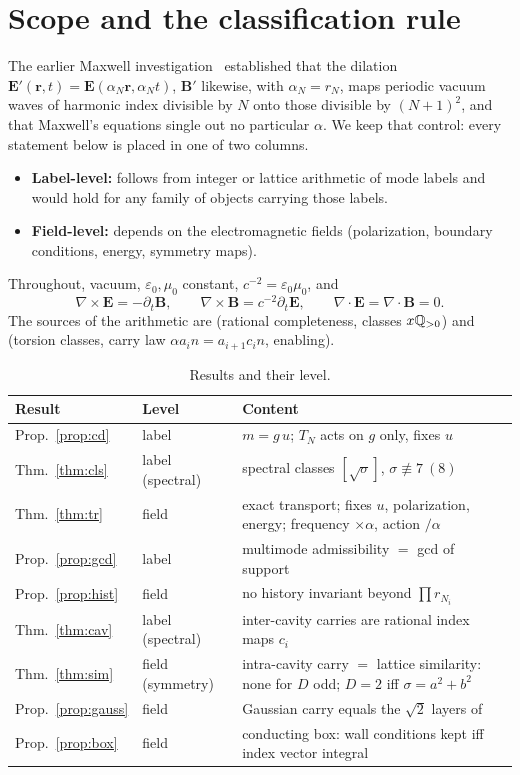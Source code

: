 \documentclass[11pt,a4paper]{article}
\theoremstyle{definition}
\theoremstyle{remark}
\newcommand{\bE}{\mathbf E}\newcommand{\bB}{\mathbf B}
\begin{document}
\section{Scope and the classification rule}
The earlier Maxwell investigation~\cite{MX} established that the dilation $\bE'(\mathbf r,t)=\bE(\alpha_N\mathbf r,\alpha_Nt)$, $\bB'$ likewise, with $\alpha_N=r_N$, maps periodic vacuum waves of harmonic index divisible by $N$ onto those divisible by $(N+1)^2$, and that Maxwell's equations single out no particular $\alpha$. We keep that control: every statement below is placed in one of two columns.
\begin{itemize}
\item \textbf{Label-level:} follows from integer or lattice arithmetic of mode labels and would hold for any family of objects carrying those labels.
\item \textbf{Field-level:} depends on the electromagnetic fields (polarization, boundary conditions, energy, symmetry maps).
\end{itemize}
Throughout, vacuum, $\varepsilon_0,\mu_0$ constant, $c^{-2}=\varepsilon_0\mu_0$, and
\[
\nabla\times\bE=-\partial_t\bB,\qquad \nabla\times\bB=c^{-2}\partial_t\bE,\qquad \nabla\!\cdot\bE=\nabla\!\cdot\bB=0 .
\]
The sources of the arithmetic are \cite{AT} (rational completeness, classes $x\mathbb Q_{>0}$) and \cite{TC} (torsion classes, carry law $\alpha a_in=a_{i+1}c_in$, enabling).

\begin{table}[ht]\centering\small
\begin{tabular}{@{}llp{7.6cm}@{}}
\toprule\textbf{Result}&\textbf{Level}&\textbf{Content}\\\midrule
Prop.~\ref{prop:cd}&label&$m=g\,u$; $T_N$ acts on $g$ only, fixes $u$\\
Thm.~\ref{thm:cls}&label (spectral)&spectral classes $[\sqrt\sigma]$, $\sigma\not\equiv7\ (8)$\\
Thm.~\ref{thm:tr}&field&exact transport; fixes $u$, polarization, energy; frequency $\times\alpha$, action $/\alpha$\\
Prop.~\ref{prop:gcd}&label&multimode admissibility $=$ gcd of support\\
Prop.~\ref{prop:hist}&field&no history invariant beyond $\prod r_{N_i}$\\
Thm.~\ref{thm:cav}&label (spectral)&inter-cavity carries are rational index maps $c_i$\\
Thm.~\ref{thm:sim}&field (symmetry)&intra-cavity carry $=$ lattice similarity: none for $D$ odd; $D=2$ iff $\sigma=a^2+b^2$\\
Prop.~\ref{prop:gauss}&field&Gaussian carry equals the $\sqrt2$ layers of~\cite{TC}\\
Prop.~\ref{prop:box}&field&conducting box: wall conditions kept iff index vector integral\\
\bottomrule\end{tabular}\caption{Results and their level.}\end{table}
\end{document}
